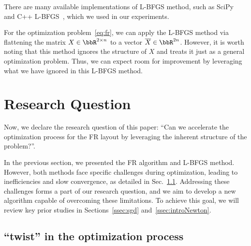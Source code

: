 \documentclass[dvipdfmx,journal]{IEEEtran}
\begin{document}
There are many available implementations of L-BFGS method, such as SciPy~\cite{2020SciPy-NMeth} and C++ L-BFGS~\cite{qiuYixuanLBFGSpp2024,okazakiChokkanLiblbfgs2024}, which we used in our experiments.

For the optimization problem~\eqref{eq:fr}, we can apply the L-BFGS method via flattening the matrix $X \in \bbR^{2 \times n}$ to a vector $\overline{X} \in \bbR^{2n}$.
However, it is worth noting that this method ignores the structure of $X$ and treats it just as a general optimization problem.
Thus, we can expect room for improvement by leveraging what we have ignored in this L-BFGS method.

\section{Research Question}\label{sec:RQ}

Now, we declare the research question of this paper: ``Can we accelerate the optimization process for the FR layout by leveraging the inherent structure of the problem?''.

In the previous section, we presented the FR algorithm and L-BFGS method. However, both methods face specific challenges during optimization, leading to inefficiencies and slow convergence, as detailed in Sec.~\ref{ssec:twist}.
Addressing these challenges forms a part of our research question, and we aim to develop a new algorithm capable of overcoming these limitations. To achieve this goal, we will review key prior studies in Sections~\ref{ssec:sgd} and~\ref{ssec:introNewton}.

\subsection{``twist'' in the optimization process}\label{ssec:twist}
\end{document}
